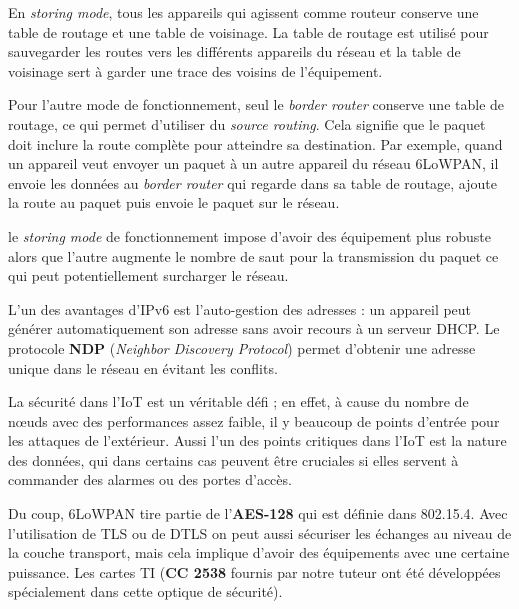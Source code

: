 En \textit{storing mode}, tous les appareils qui agissent comme routeur conserve une table de routage et une table de voisinage. La table de routage est utilisé pour sauvegarder les routes vers les différents appareils du réseau et la table de voisinage sert à garder une trace des voisins de l'équipement. 

Pour l'autre mode de fonctionnement, seul le \textit{border router} conserve une table de routage, ce qui permet d'utiliser du \textit{source routing}. Cela signifie que le paquet doit inclure la route complète pour atteindre sa destination. Par exemple, quand un appareil veut envoyer un paquet à un autre appareil du réseau 6LoWPAN, il envoie les données au \textit{border router} qui regarde dans sa table de routage, ajoute la route au paquet puis envoie le paquet sur le réseau.

le \textit{storing mode} de fonctionnement impose d'avoir des équipement plus robuste alors que l'autre augmente le nombre de saut pour la transmission du paquet ce qui peut potentiellement surcharger le réseau.

L'un des avantages d'IPv6 est l'auto-gestion des adresses : un appareil peut générer automatiquement son adresse sans avoir recours à un serveur DHCP. Le protocole \textbf{NDP} (\textit{Neighbor Discovery Protocol}) permet d'obtenir une adresse unique dans le réseau en évitant les conflits.

La sécurité dans l'IoT est un véritable défi ; en effet, à cause du nombre de nœuds avec des performances assez faible, il y beaucoup de points d'entrée pour les attaques de l'extérieur. Aussi l'un des points critiques dans l'IoT est la nature des données, qui dans certains cas peuvent être cruciales si elles servent à commander des alarmes ou des portes d'accès.

Du coup, 6LoWPAN tire partie de l'\textbf{AES-128} qui est définie dans 802.15.4. Avec l'utilisation de TLS ou de DTLS on peut aussi sécuriser les échanges au niveau de la couche transport, mais cela implique d'avoir des équipements avec une certaine puissance. Les cartes TI (\textbf{CC 2538} fournis par notre tuteur ont été développées spécialement dans cette optique de sécurité).

